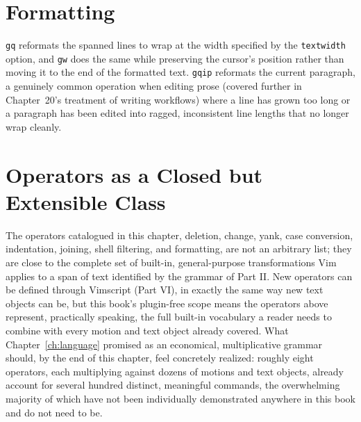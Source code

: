 \section{Formatting}

\texttt{gq} reformats the spanned lines to wrap at the width specified by the \texttt{textwidth} option, and \texttt{gw} does the same while preserving the cursor's position rather than moving it to the end of the formatted text. \texttt{gqip} reformats the current paragraph, a genuinely common operation when editing prose (covered further in Chapter~20's treatment of writing workflows) where a line has grown too long or a paragraph has been edited into ragged, inconsistent line lengths that no longer wrap cleanly.

\section{Operators as a Closed but Extensible Class}

The operators catalogued in this chapter, deletion, change, yank, case conversion, indentation, joining, shell filtering, and formatting, are not an arbitrary list; they are close to the complete set of built-in, general-purpose transformations Vim applies to a span of text identified by the grammar of Part II. New operators can be defined through Vimscript (Part VI), in exactly the same way new text objects can be, but this book's plugin-free scope means the operators above represent, practically speaking, the full built-in vocabulary a reader needs to combine with every motion and text object already covered. What Chapter~\ref{ch:language} promised as an economical, multiplicative grammar should, by the end of this chapter, feel concretely realized: roughly eight operators, each multiplying against dozens of motions and text objects, already account for several hundred distinct, meaningful commands, the overwhelming majority of which have not been individually demonstrated anywhere in this book and do not need to be.
